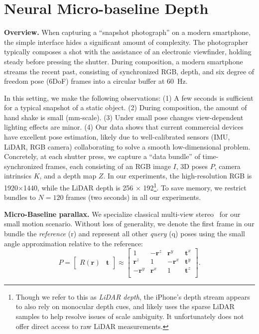 \section{Neural Micro-baseline Depth}

\noindent
\noindent\textbf{Overview.}\hspace{0.1em} When capturing a ``snapshot photograph'' on a modern smartphone, the simple interface hides a significant amount of complexity. The photographer typically composes a shot with the assistance of an electronic viewfinder, holding steady before pressing the shutter. During composition, a modern smartphone streams the recent past, consisting of synchronized RGB, depth, and six degree of freedom pose (6DoF) frames into a circular buffer at 60~Hz.

In this setting, we make the following observations:
(1) A few seconds is sufficient for a typical snapshot of a static object.
(2) During composition, the amount of hand shake is small (mm-scale).
(3) Under small pose changes view-dependent lighting effects are minor.
(4) Our data shows that current commercial devices have excellent pose estimation, likely due to well-calibrated sensors (IMU, LiDAR, RGB camera) collaborating to solve a smooth low-dimensional problem.
Concretely, at each shutter press, we capture a ``data bundle'' of time-synchronized frames, each consisting of an RGB image $I$, 3D poses $P$, camera intrinsics $K$, and a depth map $Z$. In our experiments, the high-resolution RGB is 1920$\times$1440, while the LiDAR depth is 256 $\times$ 192\footnote{Though we refer to this as \emph{LiDAR depth}, the iPhone's depth stream appears to also rely on monocular depth cues, and likely uses the sparse LiDAR samples to help resolve issues of scale ambiguity. It unfortunately does not offer direct access to raw LiDAR measurements.}. To save memory, we restrict bundles to $N = 120$ frames (two seconds) in all our experiments.

\noindent\textbf{Micro-Baseline parallax.}\hspace{0.1em}
We specialize classical multi-view stereo~\cite{10.5555/861369} for our small motion scenario. Without loss of generality, we denote the first frame in our bundle the \emph{reference} (r) and represent all other \emph{query} (q) poses using the small angle approximation relative to the reference:
\begin{equation}\label{eq:pose}
P = \left[\begin{array}{c|c} 
R(\bm{r}) & \bm{t}
\end{array}\right]
\approx  
\left[\begin{array}{ccc|c}
1 & -\bm{r}^{z} & \bm{r}^{y} & \bm{t}^{x} \\
\bm{r}^{z} & 1 & -\bm{r}^{x} & \bm{t}^{y} \\
-\bm{r}^{y} & \bm{r}^{x} & 1 & \bm{t}^{z} \\
\end{array}\right].
\end{equation}

